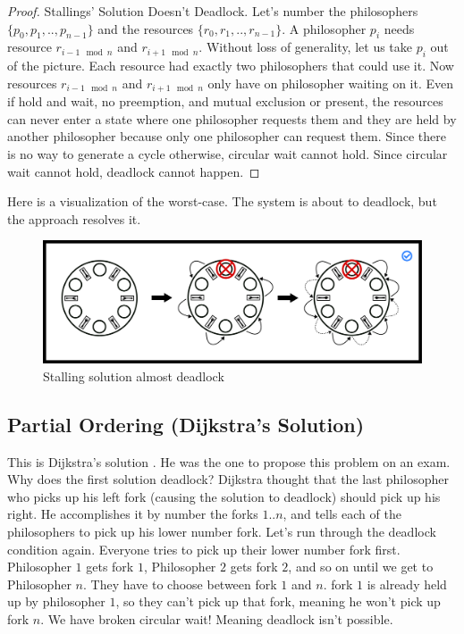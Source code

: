 \begin{proof} Stallings' Solution Doesn't Deadlock.
  Let's number the philosophers $\{p_0, p_1, .., p_{n-1}\}$ and the resources $\{r_0, r_1, .., r_{n-1}\}$.
  A philosopher $p_i$ needs resource $r_{i-1 \mod n}$ and $r_{i + 1 \mod n}$.
  Without loss of generality, let us take $p_i$ out of the picture.
  Each resource had exactly two philosophers that could use it.
  Now resources $r_{i-1 \mod n}$ and $r_{i + 1 \mod n}$ only have on philosopher waiting on it.
  Even if hold and wait, no preemption, and mutual exclusion or present, the resources can never enter a state where one philosopher requests them and they are held by another philosopher because only one philosopher can request them.
  Since there is no way to generate a cycle otherwise, circular wait cannot hold.
  Since circular wait cannot hold, deadlock cannot happen.
\end{proof}

Here is a visualization of the worst-case.
The system is about to deadlock, but the approach resolves it.

\begin{figure}[H]
\centering
\includegraphics[width=.9\textwidth]{deadlock/drawings/dining_stalling.eps}
\caption{Stalling solution almost deadlock}
\end{figure}


\subsection{Partial Ordering (Dijkstra's Solution)}

This is Dijkstra's solution \cite[P. 20]{EWD:EWD310}. He was the one to propose this problem on an exam.
Why does the first solution deadlock? Dijkstra thought that the last philosopher who picks up his left fork (causing the solution to deadlock) should pick up his right.
He accomplishes it by number the forks $1..n$, and tells each of the philosophers to pick up his lower number fork.
Let's run through the deadlock condition again.
Everyone tries to pick up their lower number fork first.
Philosopher $1$ gets fork $1$, Philosopher $2$ gets fork $2$, and so on until we get to Philosopher $n$.
They have to choose between fork $1$ and $n$.
fork $1$ is already held up by philosopher $1$, so they can't pick up that fork, meaning he won't pick up fork $n$.
We have broken circular wait! Meaning deadlock isn't possible.


